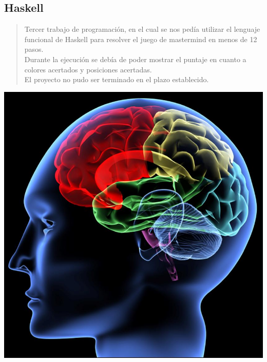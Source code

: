 \documentclass[10pt]{article}
\begin{document}
{\begin{flushleft}
\section{Haskell}
\vspace{0.4in}
\begin{abstract}
\vspace{0.2in}
\large{Tercer trabajo de programaci\'on, en el cual se nos ped\'ia utilizar el lenguaje funcional de Haskell para resolver el juego de mastermind en menos de 12 pasos.\\
Durante la ejecuci\'on se deb\'ia de poder mostrar el puntaje en cuanto a colores acertados y posiciones acertadas.\\
El proyecto no pudo ser terminado en el plazo establecido.\\}
\end{abstract}
\begin{center}
\vspace{0.3in}
\includegraphics[scale=0.4]{mastermind}
\\\vspace{0.3in}

\end{center}
\end{flushleft}}
\end{document}

